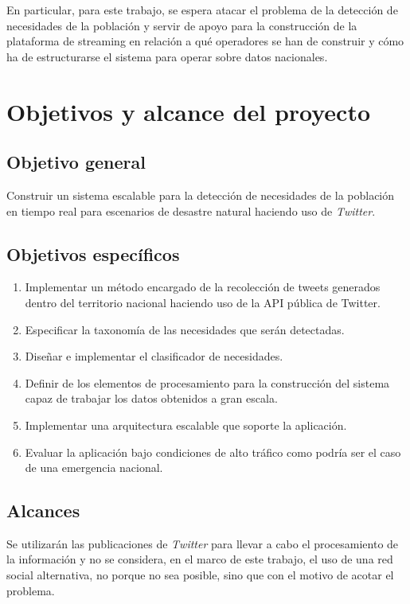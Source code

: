 En particular, para este trabajo, se espera atacar el problema de la detección de necesidades de la población y servir de apoyo para la construcción de la plataforma de streaming en relación a qué operadores se han de construir y cómo ha de estructurarse el sistema para operar sobre datos nacionales.


\section{Objetivos y alcance del proyecto}
\label{intro:objetivos}

\subsection{Objetivo general}
	Construir un sistema escalable para la detección de necesidades de la población en tiempo real para escenarios de desastre natural haciendo uso de \textit{Twitter}.

\subsection{Objetivos específicos}
\begin{enumerate}
\item	Implementar un método encargado de la recolección de tweets generados dentro del territorio nacional haciendo uso de la API pública de Twitter.
\item	Especificar la taxonomía de las necesidades que serán detectadas.
\item	Diseñar e implementar el clasificador de necesidades.
\item	Definir de los elementos de procesamiento para la construcción del sistema capaz de trabajar los datos obtenidos a gran escala.
\item	Implementar una arquitectura escalable que soporte la aplicación.
\item	Evaluar la aplicación bajo condiciones de alto tráfico como podría ser el caso de una emergencia nacional.
\end{enumerate}

\subsection{Alcances}
Se utilizarán las publicaciones de \textit{Twitter} para llevar a cabo el procesamiento de la información y no se considera, en el marco de este trabajo, el uso de una red social alternativa, no porque no sea posible, sino que con el motivo de acotar el problema.\\

